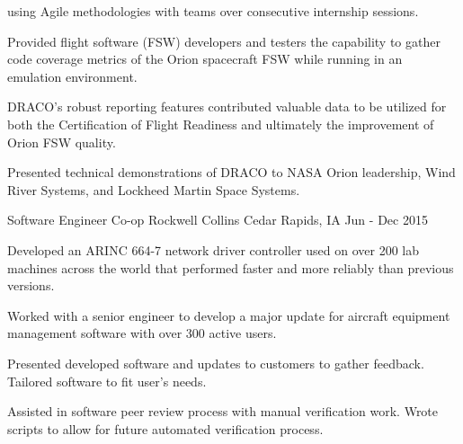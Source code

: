 \begin{cventries}
{\begin{cvitems}
{using Agile methodologies with teams over consecutive internship sessions.}
        \item {Provided flight software (FSW) developers and testers the capability to gather code coverage
metrics of the Orion spacecraft FSW while running in an emulation environment.}
        \item {DRACO’s robust reporting features contributed valuable data to be utilized for both the
Certification of Flight Readiness and ultimately the improvement of Orion FSW quality.}
        \item {Presented technical demonstrations of DRACO to NASA Orion leadership, Wind River Systems,
and Lockheed Martin Space Systems.}
      \end{cvitems}
    }
  \cventry
    {Software Engineer Co-op}
    {Rockwell Collins} 
    {Cedar Rapids, IA}
    {Jun - Dec 2015} 
    {
      \begin{cvitems}
        \item {Developed an ARINC 664-7 network driver controller used on over 200 lab machines across the
world that performed faster and more reliably than previous versions.}
        \item {Worked with a senior engineer to develop a major update for aircraft equipment management
software with over 300 active users.}
        \item {Presented developed software and updates to customers to gather feedback. Tailored software to fit user's needs.}
        \item {Assisted in software peer review process with manual verification work. Wrote scripts to allow for future automated verification process.}
      \end{cvitems}
    }
\end{cventries}

